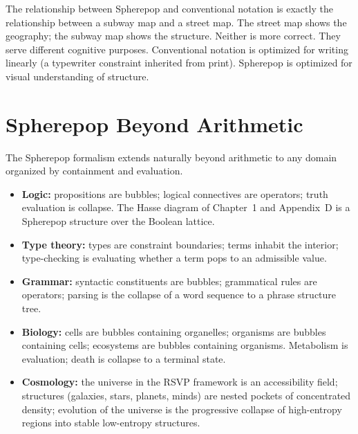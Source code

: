 \begin{remark}
  The relationship between Spherepop and conventional notation is exactly
  the relationship between a subway map and a street map. The street map
  shows the geography; the subway map shows the structure. Neither is
  more correct. They serve different cognitive purposes. Conventional
  notation is optimized for writing linearly (a typewriter constraint
  inherited from print). Spherepop is optimized for visual understanding
  of structure.
\end{remark}

\section{Spherepop Beyond Arithmetic}

The Spherepop formalism extends naturally beyond arithmetic to any domain
organized by containment and evaluation.

\begin{itemize}
  \item \textbf{Logic:} propositions are bubbles; logical connectives
        are operators; truth evaluation is collapse. The Hasse diagram
        of Chapter~1 and Appendix~D is a Spherepop structure over the
        Boolean lattice.
  \item \textbf{Type theory:} types are constraint boundaries; terms
        inhabit the interior; type-checking is evaluating whether a
        term pops to an admissible value.
  \item \textbf{Grammar:} syntactic constituents are bubbles; grammatical
        rules are operators; parsing is the collapse of a word sequence
        to a phrase structure tree.
  \item \textbf{Biology:} cells are bubbles containing organelles;
        organisms are bubbles containing cells; ecosystems are bubbles
        containing organisms. Metabolism is evaluation; death is collapse
        to a terminal state.
  \item \textbf{Cosmology:} the universe in the RSVP framework is an
        accessibility field; structures (galaxies, stars, planets, minds)
        are nested pockets of concentrated density; evolution of the
        universe is the progressive collapse of high-entropy regions
        into stable low-entropy structures.
\end{itemize}

